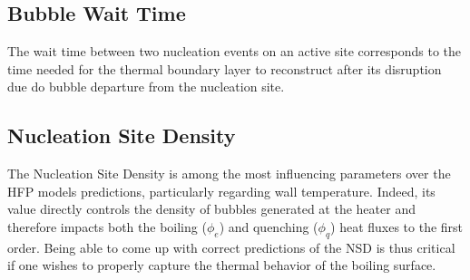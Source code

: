 \subsection{Bubble Wait Time}

The wait time between two nucleation events on an active site corresponds to the time needed for the thermal boundary layer to reconstruct after its disruption due do bubble departure from the nucleation site.  
\begin{table}[h!]


\noindent{}

\caption{Bubble wait time data in vertical flow boiling}
\label{tab:tw_exp_data}



\end{table}



\subsection{Nucleation Site Density}

The Nucleation Site Density is among the most influencing parameters over the HFP models predictions, particularly regarding wall temperature. Indeed, its value directly controls the density of bubbles generated at the heater and therefore impacts both the boiling ($\phi_{e}$) and quenching ($\phi_{q}$) heat fluxes to the first order. Being able to come up with correct predictions of the NSD is thus critical if one wishes to properly capture the thermal behavior of the boiling surface.

